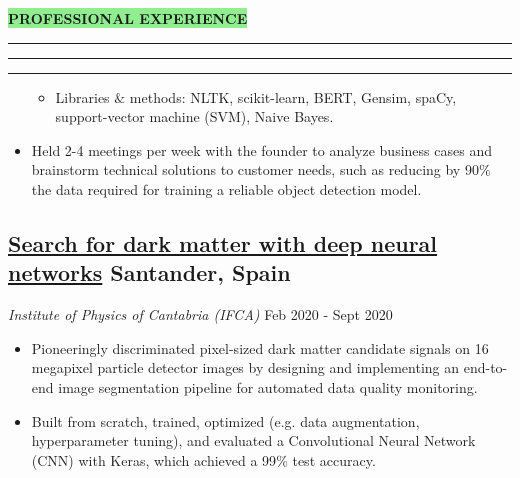 \documentclass{resume}
\renewenvironment{rSection}[1]{
\sectionskip
\vspace{-3.5pt}
\colorbox{lightGreen}{\hspace{-3pt}\MakeUppercase{\large{\textbf{#1}}}}
\vspace{3pt}
\hrule
\hrule
\hrule
\begin{list}{}{
\setlength{\leftmargin}{1.5em}
}
\item[]
}{
\end{list}
}
\begin{document}
\begin{rSection}{Professional Experience}
\begin{adjustwidth}{-6.5mm}{0pt}
\begin{itemize}
    \begin{itemize}
    \vspace{-5pt}
        \item Libraries $\&$ methods: NLTK, scikit-learn, BERT, Gensim, spaCy, support-vector machine (SVM), Naive Bayes.
    \end{itemize}
   
    \item Held 2-4 meetings per week with the founder to analyze business cases and brainstorm technical solutions to customer needs, such as reducing by 90$\%$ the data required for training a reliable object detection model.
    
\end{itemize}
\end{adjustwidth}

\vspace{-10pt}
\vspace{-22pt}

\begin{adjustwidth}{-6mm}{0pt}
\vspace{-5pt}
\subsection*{\href{https://github.com/aritzLizoain/CNN-Image-segmentation}{Search for dark matter with deep neural networks} \hfill \normalsize{Santander, Spain}}
\vspace{-7pt}
\textit{Institute of Physics of Cantabria (IFCA)} \hfill Feb 2020 - Sept 2020
\end{adjustwidth} 
\begin{adjustwidth}{-6.5mm}{0pt}

\begin{itemize}

    \item Pioneeringly discriminated pixel-sized dark matter candidate signals on 16 megapixel particle detector images by designing and implementing an end-to-end image segmentation pipeline for automated data quality monitoring.
    
    \item Built from scratch, trained, optimized (e.g. data augmentation, hyperparameter tuning), and evaluated a Convolutional Neural Network (CNN) with Keras, which achieved a 99$\%$ test accuracy.
    

\end{itemize}
\end{adjustwidth}
\end{rSection}
\end{document}
